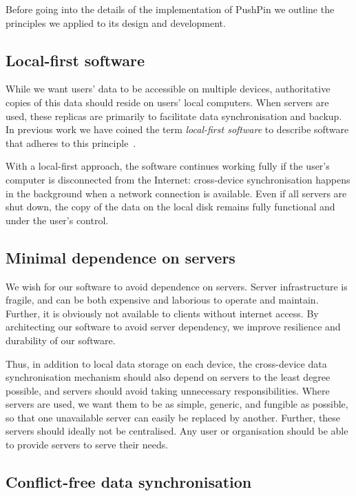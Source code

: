 \documentclass[sigplan,10pt]{acmart}
\begin{document}
Before going into the details of the implementation of PushPin we outline the principles we applied to its design and development.

\subsection{Local-first software}

While we want users' data to be accessible on multiple devices, authoritative copies of this data should reside on users' local computers.
When servers are used, these replicas are primarily to facilitate data synchronisation and backup.
In previous work we have coined the term \emph{local-first software} to describe software that adheres to this principle~\cite{LocalFirst}.

With a local-first approach, the software continues working fully if the user's computer is disconnected from the Internet: cross-device synchronisation happens in the background when a network connection is available.
Even if all servers are shut down, the copy of the data on the local disk remains fully functional and under the user's control.

\subsection{Minimal dependence on servers}

We wish for our software to avoid dependence on servers. Server infrastructure is fragile, and can be both expensive and laborious to operate and maintain. Further, it is obviously not available to clients without internet access. By architecting our software to avoid server dependency, we improve resilience and durability of our software.

Thus, in addition to local data storage on each device, the cross-device data synchronisation mechanism should also depend on servers to the least degree possible, and servers should avoid taking unnecessary responsibilities. Where servers are used, we want them to be as simple, generic, and fungible as possible, so that one unavailable server can easily be replaced by another. Further, these servers should ideally not be centralised. Any user or organisation should be able to provide servers to serve their needs.

\subsection{Conflict-free data synchronisation}
\end{document}
